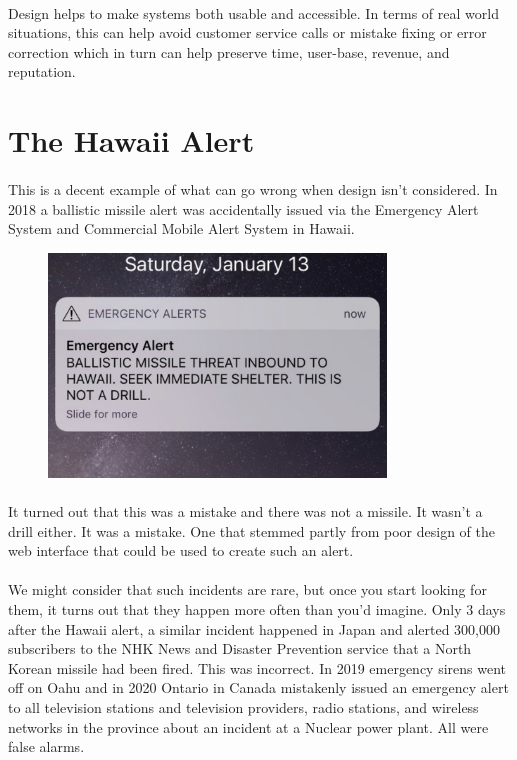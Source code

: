 \paragraph{} Design helps to make systems both usable and accessible. In terms of real world situations, this can help avoid customer service calls or mistake fixing or error correction which in turn can help preserve time, user-base, revenue, and reputation.


\section{The Hawaii Alert}
\paragraph{} This is a decent example of what can go wrong when design isn't considered. In 2018 a ballistic missile alert was accidentally issued via the Emergency Alert System and Commercial Mobile Alert System in Hawaii. 


\begin{figure}[H]
    \centering
    \includegraphics[width=0.8\textwidth]{figures/hawaii}
    \label{fig:hawaii}
    \caption{}
\end{figure}


\paragraph{} It turned out that this was a mistake and there was not a missile. It wasn't a drill either. It was a mistake. One that stemmed partly from poor design of the web interface that could be used to create such an alert.
\paragraph{} We might consider that such incidents are rare, but once you start looking for them, it turns out that they happen more often than you'd imagine. Only 3 days after the Hawaii alert, a similar incident happened in Japan and alerted 300,000 subscribers to the NHK News and Disaster Prevention service that a North Korean missile had been fired. This was incorrect. In 2019 emergency sirens went off on Oahu and in 2020 Ontario in Canada mistakenly issued an emergency alert to all television stations and television providers, radio stations, and wireless networks in the province about an incident at a Nuclear power plant. All were false alarms.

